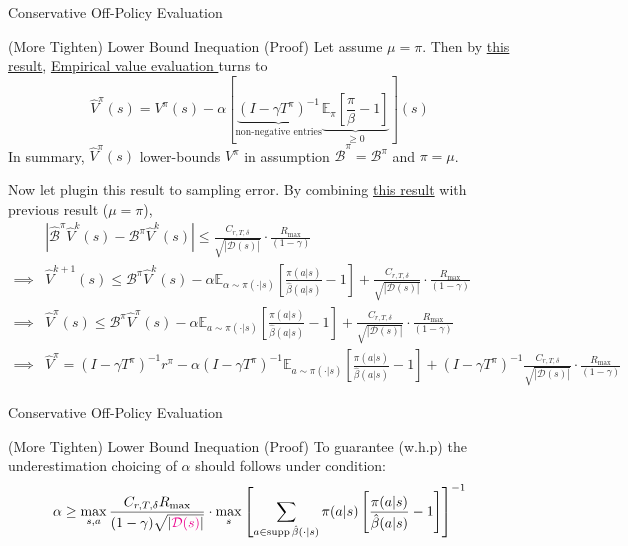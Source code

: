 \documentclass[11pt]{beamer}
\newcommand{\mbb}[1]{\mathbb{#1}}
\newcommand{\mc}[1]{\mathcal{#1}}
\newcommand{\abs}[1]{\left\lvert #1 \right\rvert}
\newcommand{\supp}{\operatorname{supp}}
\begin{document}
\begin{frame}{Conservative Off-Policy Evaluation}
  \begin{block}{(More Tighten) Lower Bound Inequation (Proof)}
    Let assume $\mu = \pi$.
    Then by \hyperlink{thm:2_underestimate}{this result}, \hyperlink{thm:v_update_without_sampling_error}{Empirical value evaluation } turns to
    \[
      \hat{V}^{\pi}(s) = V^{\pi}(s) - \alpha\left[ \underbrace{(I - \gamma T^\pi)^{-1}}_{\text{non-negative entries}}  \underbrace{\mbb{E}_{\pi}\left[\frac{\pi}{\beta}-1\right]}_{\geq 0}\right](s)
    \]
    In summary, $\hat{V}^\pi (s)$ lower-bounds $V^{\pi}$ in assumption $\hat{\mc{B}}^\pi = \mc{B}^\pi$ and $\pi = \mu$.

    \bigskip
    Now let plugin this result to sampling error.
    By combining \hyperlink{thm:sampling_error_value_version}{this result} with previous result ($\mu = \pi$),
    \[
    \begin{aligned}
      &\abs{\hat{\mc{B}}^\pi \hat{V}^k(s) - \mc{B}^\pi \hat{V}^k(s)} \leq \frac{C_{r,T,\delta}}{\sqrt{\abs{\mc{D}(s)}}} \cdot \frac{R_{\text{max}}}{(1-\gamma)}  \\
      \implies &\hat{V}^{k+1} (s) \leq \mc{B}^\pi \hat{V}^k (s) -  \alpha \mbb{E}_{\alpha \sim \pi(\cdot|s) }\left[\frac{\pi(a|s)}{\hat{\beta}(a|s)}-1\right] + \frac{C_{r,T,\delta}}{\sqrt{\abs{\mc{D}(s)}}} \cdot \frac{R_{\text{max}}}{(1-\gamma)} \\
      \implies & \hat{V}^\pi (s) \leq \mc{B}^\pi \hat{V}^\pi (s) - \alpha \mbb{E}_{a \sim \pi(\cdot|s)} \left[\frac{\pi(a|s)}{\hat{\beta}(a|s)} -1\right] + \frac{C_{r,T,\delta}}{\sqrt{\abs{\mc{D}(s)}}} \cdot \frac{R_{\text{max}}}{(1-\gamma)} \\
      \implies & \hat{V}^\pi = (I - \gamma T^\pi)^{-1} r^\pi - \alpha (I - \gamma T^\pi)^{-1} \mbb{E}_{a \sim \pi(\cdot|s)} \left[\frac{\pi(a|s)}{\hat{\beta}(a|s)}-1\right] + (I - \gamma T^\pi)^{-1} \frac{C_{r,T,\delta}}{\sqrt{\abs{\mc{D}(s)}}} \cdot \frac{R_{\text{max}}}{(1-\gamma)}
    \end{aligned}
    \]
  \end{block}
\end{frame}

\begin{frame}{Conservative Off-Policy Evaluation}
  \begin{block}{(More Tighten) Lower Bound Inequation (Proof)}
    To guarantee (w.h.p) the underestimation choicing of $\alpha$ should follows under condition:
    \[  
      \alpha \geq \max_{s,a} \frac{C_{r,T,\delta} R_{\text{max}}}{(1-\gamma) \sqrt{\abs{\textcolor{magenta}{\mc{D}(s)}}}} \cdot \max_{s} \left[ \sum_{a \in \supp \hat{\beta}(\cdot|s)}  \pi(a|s) \left[\frac{\pi(a|s)}{\hat{\beta}(a|s)}-1\right]\right]^{-1}
    \]
  \end{block}
\end{frame}
\end{document}
